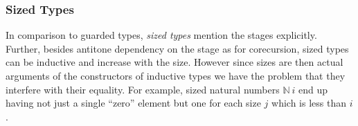 \documentclass{book}
\newcommand{\sNat}{\mathbb{N}}
\begin{document}




\subsubsection{Sized Types}

In comparison to guarded types, \emph{sized types} mention the stages
explicitly.  Further, besides antitone dependency on the stage as for
corecursion, sized types can be inductive and increase with the size.
However since sizes are then actual arguments of the constructors of
inductive types we have the problem that they interfere with their
equality.
For example, sized natural
numbers $\sNat~i$ end up having not just a single ``zero'' element
but one for each size $j$ which is less than $i$.
\end{document}
